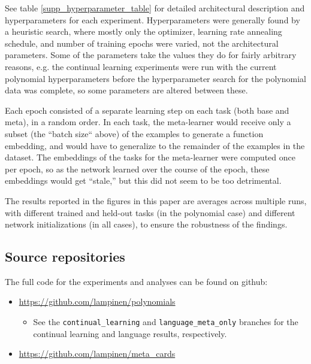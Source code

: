 \documentclass{article}
\begin{document}
See table \ref{supp_hyperparameter_table} for detailed architectural description and hyperparameters for each experiment. Hyperparameters were generally found by a heuristic search, where mostly only the optimizer, learning rate annealing schedule, and number of training epochs were varied, not the architectural parameters. Some of the parameters take the values they do for fairly arbitrary reasons, e.g. the continual learning experiments were run with the current polynomial hyperparameters before the hyperparameter search for the polynomial data was complete, so some parameters are altered between these. \par
Each epoch consisted of a separate learning step on each task (both base and meta), in a random order. In each task, the meta-learner would receive only a subset (the ``batch size`` above) of the examples to generate a function embedding, and would have to generalize to the remainder of the examples in the dataset. The embeddings of the tasks for the meta-learner were computed once per epoch, so as the network learned over the course of the epoch, these embeddings would get ``stale,'' but this did not seem to be too detrimental. \par 
The results reported in the figures in this paper are averages across multiple runs, with different trained and held-out tasks (in the polynomial case) and different network initializations (in all cases), to ensure the robustness of the findings. \par 

\subsection{Source repositories}
The full code for the experiments and analyses can be found on github:
\begin{itemize}
\item \url{https://github.com/lampinen/polynomials}
    \begin{itemize}
        \item See the \verb|continual_learning| and \verb|language_meta_only| branches for the continual learning and language results, respectively. 
    \end{itemize}
\item \url{https://github.com/lampinen/meta_cards} 
\end{itemize}
\end{document}
